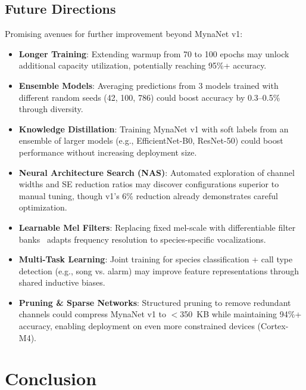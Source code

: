 \documentclass[conference]{IEEEtran}
\begin{document}
\subsection{Future Directions}
\label{sec:future}

Promising avenues for further improvement beyond MynaNet v1:

\begin{itemize}
    \item \textbf{Longer Training}: Extending warmup from 70 to 100 epochs may unlock additional capacity utilization, potentially reaching 95\%+ accuracy.

    \item \textbf{Ensemble Models}: Averaging predictions from 3 models trained with different random seeds (42, 100, 786) could boost accuracy by 0.3--0.5\% through diversity.

    \item \textbf{Knowledge Distillation}: Training MynaNet v1 with soft labels from an ensemble of larger models (e.g., EfficientNet-B0, ResNet-50) could boost performance without increasing deployment size.

    \item \textbf{Neural Architecture Search (NAS)}: Automated exploration of channel widths and SE reduction ratios may discover configurations superior to manual tuning, though v1's 6\% reduction already demonstrates careful optimization.

    \item \textbf{Learnable Mel Filters}: Replacing fixed mel-scale with differentiable filter banks~\cite{zeghidour2018learning} adapts frequency resolution to species-specific vocalizations.

    \item \textbf{Multi-Task Learning}: Joint training for species classification + call type detection (e.g., song vs. alarm) may improve feature representations through shared inductive biases.

    \item \textbf{Pruning \& Sparse Networks}: Structured pruning to remove redundant channels could compress MynaNet v1 to $<$350~KB while maintaining 94\%+ accuracy, enabling deployment on even more constrained devices (Cortex-M4).
\end{itemize}

\section{Conclusion}
\label{sec:conclusion}
\end{document}
